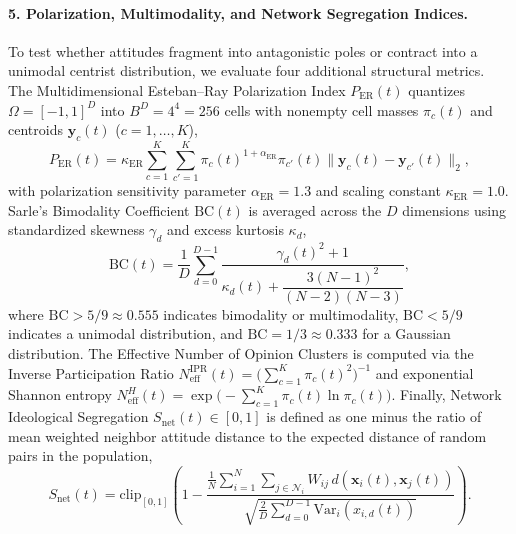 \documentclass{article}
\begin{document}
\paragraph{5. Polarization, Multimodality, and Network Segregation Indices.}
To test whether attitudes fragment into antagonistic poles or contract into a unimodal centrist distribution, we evaluate four additional structural metrics. The Multidimensional Esteban--Ray Polarization Index $P_{\mathrm{ER}}(t)$ \citep{esteban1994measurement} quantizes $\Omega = [-1, 1]^D$ into $B^D = 4^4 = 256$ cells with nonempty cell masses $\pi_c(t)$ and centroids $\mathbf{y}_c(t)$ ($c = 1, \dots, K$),
\begin{equation}
    P_{\mathrm{ER}}(t) = \kappa_{\mathrm{ER}} \sum_{c=1}^K \sum_{c'=1}^K \pi_c(t)^{1 + \alpha_{\mathrm{ER}}} \pi_{c'}(t) \|\mathbf{y}_c(t) - \mathbf{y}_{c'}(t)\|_2,
    \label{eq:esteban_ray}
\end{equation}
with polarization sensitivity parameter $\alpha_{\mathrm{ER}} = 1.3$ and scaling constant $\kappa_{\mathrm{ER}} = 1.0$. Sarle's Bimodality Coefficient $\mathrm{BC}(t)$ \citep{pfister2013good} is averaged across the $D$ dimensions using standardized skewness $\gamma_d$ and excess kurtosis $\kappa_d$,
\begin{equation}
    \mathrm{BC}(t) = \frac{1}{D}\sum_{d=0}^{D-1} \frac{\gamma_d(t)^2 + 1}{\kappa_d(t) + \dfrac{3(N-1)^2}{(N-2)(N-3)}},
    \label{eq:sarle_bc}
\end{equation}
where $\mathrm{BC} > 5/9 \approx 0.555$ indicates bimodality or multimodality, $\mathrm{BC} < 5/9$ indicates a unimodal distribution, and $\mathrm{BC} = 1/3 \approx 0.333$ for a Gaussian distribution. The Effective Number of Opinion Clusters \citep{laakso1979effective, jost2006entropy} is computed via the Inverse Participation Ratio $N_{\mathrm{eff}}^{\mathrm{IPR}}(t) = \big(\sum_{c=1}^K \pi_c(t)^2\big)^{-1}$ and exponential Shannon entropy $N_{\mathrm{eff}}^{H}(t) = \exp\!\big(-\sum_{c=1}^K \pi_c(t)\ln\pi_c(t)\big)$. Finally, Network Ideological Segregation $S_{\mathrm{net}}(t) \in [0, 1]$ is defined as one minus the ratio of mean weighted neighbor attitude distance to the expected distance of random pairs in the population,
\begin{equation}
    S_{\mathrm{net}}(t) = \mathrm{clip}_{[0, 1]}\!\left(1 - \frac{\frac{1}{N}\sum_{i=1}^N \sum_{j \in \mathcal{N}_i} W_{ij}\, d(\mathbf{x}_i(t), \mathbf{x}_j(t))}{\sqrt{\frac{2}{D}\sum_{d=0}^{D-1} \mathrm{Var}_i(x_{i,d}(t))}}\right).
    \label{eq:network_segregation}
\end{equation}
\end{document}
